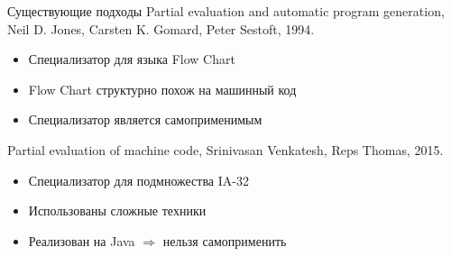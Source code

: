\documentclass{beamer}
\begin{document}
\begin{frame}{Существующие подходы}
	Partial evaluation and automatic program generation, 
	Neil D. Jones, Carsten K. Gomard, Peter Sestoft, 1994. 
    \begin{itemize}
    \vfill
    \item Специализатор для языка Flow Chart
    \vfill
    \item Flow Chart структурно похож на машинный код
    \vfill
    \item Специализатор является самоприменимым
  	\end{itemize}
  \vfill
    Partial evaluation of machine code,
    Srinivasan Venkatesh, Reps Thomas, 2015.
    \vfill
    \begin{itemize}
    \item Специализатор для подмножества IA-32
    \vfill
    \item Использованы сложные техники
    \vfill
    \item Реализован на Java $\Rightarrow$ нельзя самоприменить
  	\end{itemize}
\end{frame}
\end{document}

